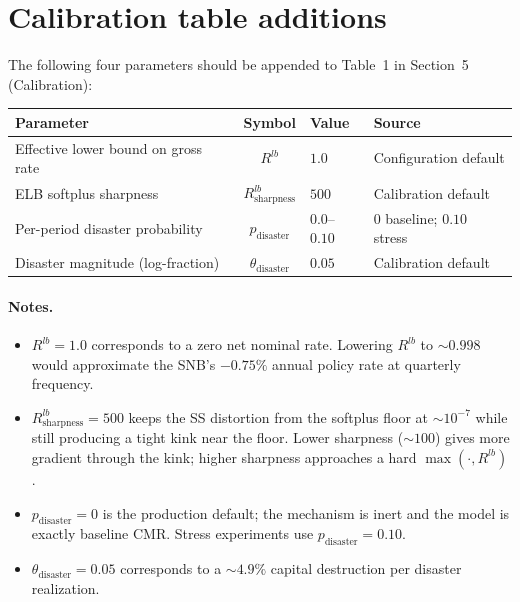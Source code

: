 \section*{Calibration table additions}

The following four parameters should be appended to Table~1 in
Section~5 (Calibration):

\begin{center}
\begin{tabular}{lcll}
\toprule
Parameter & Symbol & Value & Source \\
\midrule
Effective lower bound on gross rate & $R^{lb}$ & $1.0$ & Configuration default \\
ELB softplus sharpness & $R^{lb}_{\text{sharpness}}$ & $500$ & Calibration default \\
Per-period disaster probability & $p_{\text{disaster}}$ & $0.0$--$0.10$ & $0$ baseline; $0.10$ stress \\
Disaster magnitude (log-fraction) & $\theta_{\text{disaster}}$ & $0.05$ & Calibration default \\
\bottomrule
\end{tabular}
\end{center}

\paragraph{Notes.}
\begin{itemize}
\item $R^{lb} = 1.0$ corresponds to a zero net nominal rate. Lowering
  $R^{lb}$ to $\sim 0.998$ would approximate the SNB's $-0.75\%$ annual
  policy rate at quarterly frequency.
\item $R^{lb}_{\text{sharpness}} = 500$ keeps the SS distortion from
  the softplus floor at ${\sim}10^{-7}$ while still producing a tight
  kink near the floor. Lower sharpness ($\sim 100$) gives more
  gradient through the kink; higher sharpness approaches a hard
  $\max(\cdot, R^{lb})$.
\item $p_{\text{disaster}} = 0$ is the production default; the
  mechanism is inert and the model is exactly baseline CMR. Stress
  experiments use $p_{\text{disaster}} = 0.10$.
\item $\theta_{\text{disaster}} = 0.05$ corresponds to a ${\sim}4.9\%$
  capital destruction per disaster realization.
\end{itemize}



